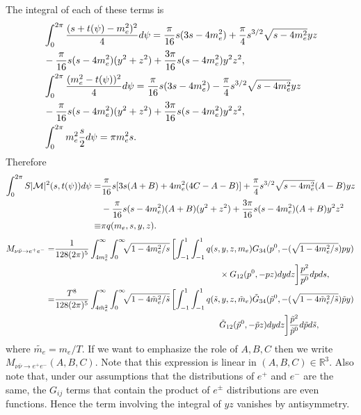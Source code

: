   The integral of each of these terms is
 \begin{align}
&\int_0^{2\pi}\frac{(s+t(\psi)-m_e^2)^2}{4}d\psi=\frac{\pi}{16}s(3s-4m_e^2)+\frac{\pi}{4}s^{3/2}\sqrt{s-4m_e^2}yz\\
&-\frac{\pi}{16}s(s-4m_e^2)(y^2+z^2)+\frac{3\pi}{16}s(s-4m_e^2)y^2z^2,\notag\\
&\int_0^{2\pi} \frac{(m_e^2-t(\psi))^2}{4}d\psi=\frac{\pi}{16}s(3s-4m_e^2)-\frac{\pi}{4}s^{3/2}\sqrt{s-4m_e^2}yz\\
&-\frac{\pi}{16}s(s-4m_e^2)(y^2+z^2)+\frac{3\pi}{16}s(s-4m_e^2)y^2z^2,\\
&\int_0^{2\pi} m_e^2\frac{s}{2} d\psi=\pi m_e^2s.
\end{align}
Therefore 
{\small
\begin{align}
\int_0^{2\pi} S |\mathcal{M}|^2 (s,t(\psi))d\psi=&\frac{\pi}{16}s[3s(A+B)+4m_e^2(4C-A-B)]+\frac{\pi}{4}s^{3/2}\sqrt{s-4m_e^2}(A-B)yz\notag\\
&-\frac{\pi}{16}s(s-4m_e^2)(A+B)(y^2+z^2)+\frac{3\pi}{16}s(s-4m_e^2)(A+B)y^2z^2\notag\\
\equiv& \pi q(m_e,s,y,z).
\end{align}
\begin{align}
M_{\nu\bar\nu\rightarrow e^+e^-}=&\frac{1}{128(2\pi)^5 }\int_{4m_e^2}^\infty\int_0^\infty\!\!\!\sqrt{1-4m_e^2/s}\left[\int_{-1}^1\int_{-1}^1q(s,y,z,m_e)G_{34}(p^0,-(\sqrt{1-4m_e^2/s})p y)\right.\notag\\
&\hspace{68mm}\times G_{12}(p^0,-p z)dydz\bigg]\frac{ p^2}{p^0}dpds,\notag\\
=&\frac{T^8}{128(2\pi)^5 }\int_{4\tilde m_e^2}^\infty\int_0^\infty\!\!\!\sqrt{1-4\tilde m_e^2/\tilde s}\left[\int_{-1}^1 \int_{-1}^1q(\tilde s,y,z,\tilde m_e)\tilde G_{34}(\tilde p^0,-(\sqrt{1-4\tilde{m}_e^2/\tilde s})\tilde p y)\right.\notag\\
&\hspace{68mm}\tilde G_{12}(\tilde p^0,-\tilde p z)dydz\bigg] \frac{ \tilde p^2}{\tilde p^0}d\tilde pd\tilde s,
\end{align}
}
where $\tilde{m_e}=m_e/T$.  If we want to emphasize the role of $A,B,C$ then we write $M_{\nu\bar\nu\rightarrow e^+e^-}(A,B,C)$.  Note that this expression is linear in $(A,B,C)\in\mathbb{R}^3$. Also note that, under our assumptions that the distributions of $e^+$ and $e^-$ are the same,  the $G_{ij}$ terms that contain the product of $e^\pm$ distributions are even functions. Hence the term involving the integral of $yz$ vanishes by antisymmetry.

